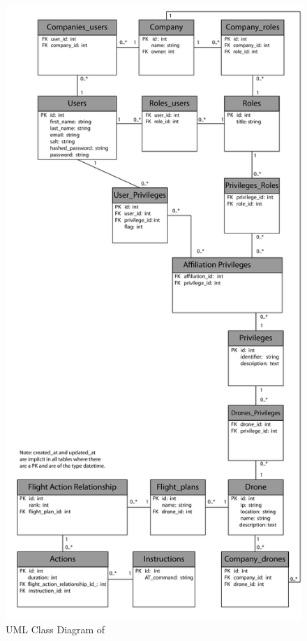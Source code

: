 \begin{figure}[htb]
    \centering
    \includegraphics[width=\textwidth]{gfx/UML_model.pdf}
    \caption{UML Class Diagram of \projectname{}}
    \label{fig:UML_class_diagram}
\end{figure}

